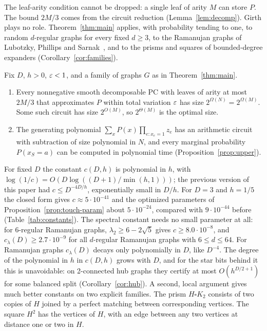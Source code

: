 The leaf-arity condition cannot be dropped: a single leaf of arity $M$ can store $P$. The bound $2M/3$ comes from the circuit reduction (Lemma~\ref{lem:decomp}). Girth plays no role. Theorem~\ref{thm:main} applies, with probability tending to one, to random $d$-regular graphs for every fixed $d\ge3$, to the Ramanujan graphs of Lubotzky, Phillips and Sarnak~\cite{LPS88}, and to the prisms and squares of bounded-degree expanders (Corollary~\ref{cor:families}).

\begin{corollary}[separation]\label{cor:separation}
Fix $D$, $h>0$, $\varepsilon<1$, and a family of graphs $G$ as in Theorem~\ref{thm:main}.
\begin{enumerate}[label=(\alph*)]
\item Every nonnegative smooth decomposable PC with leaves of arity at most $2M/3$ that approximates $P$ within total variation $\varepsilon$ has size $2^{\Omega(N)}=2^{\Omega(M)}$. Some such circuit has size $2^{O(M)}$, so $2^{\Theta(M)}$ is the optimal size.
\item The generating polynomial $\sum_xP(x)\prod_{e:x_e=1}z_e$ has an arithmetic circuit with subtraction of size polynomial in $N$, and every marginal probability $P(x_S=a)$ can be computed in polynomial time (Proposition~\ref{prop:upper}).
\end{enumerate}
\end{corollary}

For fixed $D$ the constant $c(D,h)$ is polynomial in $h$, with $\log(1/c)=O(D\log((D+1)/\min(h,1)))$; the previous version of this paper had $c\le D^{-4D/h}$, exponentially small in $D/h$. For $D=3$ and $h=1/5$ the closed form gives $c\approx5\cdot10^{-41}$ and the optimized parameters of Proposition~\ref{prop:touch-param} about $5\cdot10^{-24}$, compared with $9\cdot10^{-44}$ before (Table~\ref{tab:constants}). The spectral constant needs no small parameter at all: for 6-regular Ramanujan graphs, $\lambda_2\ge6-2\sqrt5$ gives $c\ge8.0\cdot10^{-8}$, and $c_\lambda(D)\ge2.7\cdot10^{-9}$ for all $d$-regular Ramanujan graphs with $6\le d\le64$. For Ramanujan graphs $c_\lambda(D)$ decays only polynomially in $D$, like $D^{-4}$. The degree of the polynomial in $h$ in $c(D,h)$ grows with $D$, and for the star bits behind it this is unavoidable: on 2-connected hub graphs they certify at most $O(h^{D/2+1})$ for some balanced split (Corollary~\ref{cor:hub}). A second, local argument gives much better constants on two explicit families. The prism $H\square K_2$ consists of two copies of $H$ joined by a perfect matching between corresponding vertices. The square $H^2$ has the vertices of $H$, with an edge between any two vertices at distance one or two in $H$.

